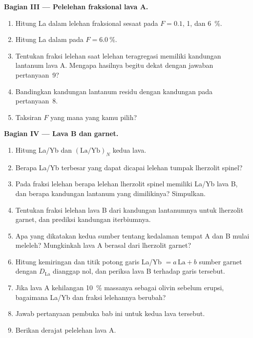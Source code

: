\begin{problem}
\medskip\noindent\textbf{Bagian III --- Pelelehan fraksional lava A.}
\begin{enumerate}[resume]
\item Hitung La dalam lelehan fraksional sesaat pada $F = 0.1$, 1, dan
\qty{6}{\percent}.
\item Hitung La dalam  pada $F = \qty{6.0}{\percent}$.
\item Tentukan fraksi lelehan saat lelehan teragregasi memiliki kandungan lantanum
lava A. Mengapa hasilnya begitu dekat dengan jawaban pertanyaan~9?
\item Bandingkan kandungan lantanum residu dengan kandungan pada pertanyaan~8.
\item Taksiran $F$ yang mana yang kamu pilih?
\end{enumerate}

\medskip\noindent\textbf{Bagian IV --- Lava B dan garnet.}
\begin{enumerate}[resume]
\item Hitung La/Yb dan $(\mathrm{La}/\mathrm{Yb})_N$ kedua lava.
\item Berapa La/Yb terbesar yang dapat dicapai lelehan tumpak lherzolit
spinel?
\item Pada fraksi lelehan berapa lelehan lherzolit spinel memiliki La/Yb
lava B, dan berapa kandungan lantanum yang dimilikinya? Simpulkan.
\item Tentukan fraksi lelehan lava B dari kandungan lantanumnya untuk
lherzolit garnet, dan prediksi kandungan iterbiumnya.
\item Apa yang dikatakan kedua sumber tentang kedalaman tempat A dan B mulai
meleleh? Mungkinkah lava A berasal dari lherzolit garnet?
\item Hitung kemiringan dan titik potong garis  La/Yb $= a\,
\mathrm{La} + b$ sumber garnet dengan $D_{\mathrm{La}}$ dianggap nol,
dan periksa lava B terhadap garis tersebut.
\item Jika lava A kehilangan \qty{10}{\percent} massanya sebagai olivin sebelum
erupsi, bagaimana La/Yb dan fraksi lelehannya berubah?
\item Jawab pertanyaan pembuka bab ini untuk kedua lava tersebut.
\item Berikan derajat pelelehan lava A.
\end{enumerate}
\end{problem}
